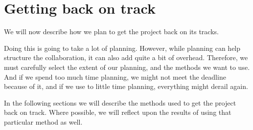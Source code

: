 \section{Getting back on track}
We will now describe how we plan to get the project back on its tracks.

Doing this is going to take a lot of planning. However, while planning can help structure the collaboration, it can also add quite a bit of overhead. Therefore, we must carefully select the extent of our planning, and the methods we want to use. And if we spend too much time planning, we might not meet the deadline because of it, and if we use to little time planning, everything might derail again.

In the following sections we will describe the methods used to get the project back on track. Where possible, we will reflect upon the results of using that particular method as well.






\newpage